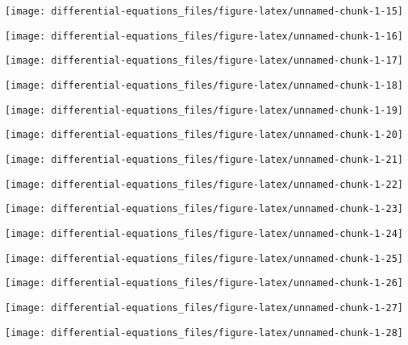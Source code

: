 \documentclass[]{tufte-handout}
\begin{document}
\begin{marginfigure}
\texttt{[image: differential-equations\_files/figure-latex/unnamed-chunk-1-15]} \end{marginfigure}
\begin{marginfigure}
\texttt{[image: differential-equations\_files/figure-latex/unnamed-chunk-1-16]} \end{marginfigure}
\begin{marginfigure}
\texttt{[image: differential-equations\_files/figure-latex/unnamed-chunk-1-17]} \end{marginfigure}
\begin{marginfigure}
\texttt{[image: differential-equations\_files/figure-latex/unnamed-chunk-1-18]} \end{marginfigure}
\begin{marginfigure}
\texttt{[image: differential-equations\_files/figure-latex/unnamed-chunk-1-19]} \end{marginfigure}
\begin{marginfigure}
\texttt{[image: differential-equations\_files/figure-latex/unnamed-chunk-1-20]} \end{marginfigure}
\begin{marginfigure}
\texttt{[image: differential-equations\_files/figure-latex/unnamed-chunk-1-21]} \end{marginfigure}
\begin{marginfigure}
\texttt{[image: differential-equations\_files/figure-latex/unnamed-chunk-1-22]} \end{marginfigure}
\begin{marginfigure}
\texttt{[image: differential-equations\_files/figure-latex/unnamed-chunk-1-23]} \end{marginfigure}
\begin{marginfigure}
\texttt{[image: differential-equations\_files/figure-latex/unnamed-chunk-1-24]} \end{marginfigure}
\begin{marginfigure}
\texttt{[image: differential-equations\_files/figure-latex/unnamed-chunk-1-25]} \end{marginfigure}
\begin{marginfigure}
\texttt{[image: differential-equations\_files/figure-latex/unnamed-chunk-1-26]} \end{marginfigure}
\begin{marginfigure}
\texttt{[image: differential-equations\_files/figure-latex/unnamed-chunk-1-27]} \end{marginfigure}
\begin{marginfigure}
\texttt{[image: differential-equations\_files/figure-latex/unnamed-chunk-1-28]} \end{marginfigure}
\end{document}
